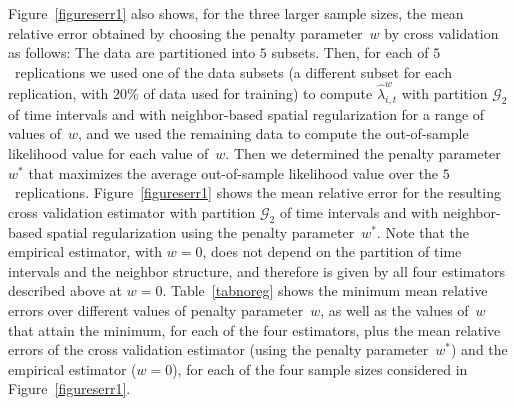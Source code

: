\documentclass[article]{jss}
\begin{document}
Figure~\ref{figureserr1} also shows, for the three larger sample sizes, the mean relative error obtained by choosing the penalty parameter~$w$ by cross validation as follows:
The data are partitioned into $5$ subsets.
Then, for each of $5$~replications we used one of the data subsets (a different subset for each replication, with 20\% of data used for training) to compute $\hat{\lambda}^{w}_{i,t}$ with partition $\mathcal{G}_{2}$ of time intervals and with neighbor-based spatial regularization for a range of values of~$w$, and we used the remaining data to compute the out-of-sample likelihood value for each value of~$w$.
Then we determined the penalty parameter~$w^*$ that maximizes the average out-of-sample likelihood value over the $5$~replications.
Figure~\ref{figureserr1} shows the mean relative error for the resulting cross validation estimator with partition $\mathcal{G}_{2}$ of time intervals and with neighbor-based spatial regularization using the penalty parameter~$w^*$.
Note that the empirical estimator, with $w = 0$, does not depend on the partition of time intervals and the neighbor structure, and therefore is given by all four estimators described above at $w = 0$.
Table~\ref{tabnoreg} shows the minimum mean relative errors over different values of penalty parameter~$w$, as well as the values of~$w$ that attain the minimum, for each of the four estimators, plus the mean relative errors of the cross validation estimator (using the penalty parameter~$w^*$) and the empirical estimator ($w = 0$), for each of the four sample sizes considered in Figure~\ref{figureserr1}.
\end{document}
